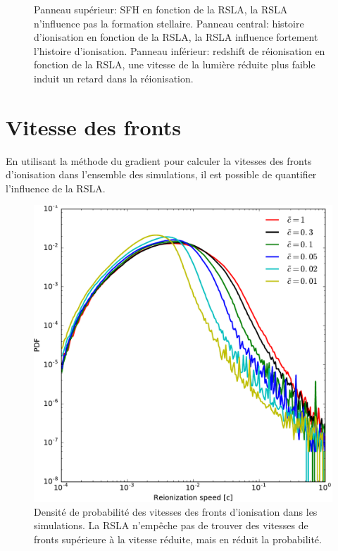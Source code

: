 \begin{figure}
        \caption[Redshift de réionisation en fonction de la RSLA]{
		Panneau supérieur: SFH en fonction de la RSLA, la RSLA n'influence pas la formation stellaire.
		Panneau central: histoire d'ionisation en fonction de la RSLA, la RSLA influence fortement l'histoire d'ionisation.
		Panneau inférieur: redshift de réionisation en fonction de la RSLA, une vitesse de la lumière réduite plus faible induit un retard dans la réionisation.
 		\label{fig:zrsla}}
\end{figure}

\clearpage 

\section{Vitesse des fronts}

En utilisant la méthode du gradient pour calculer la vitesses des fronts d'ionisation dans l'ensemble des simulations, il est possible de quantifier l'influence de la \ac{RSLA}.

\begin{figure}
        \includegraphics[width=.95\linewidth]{img/04_mapreio/PDF_v_reio.pdf} 
        \caption[PDF des vitesses de fronts]{Densité de probabilité des vitesses des fronts d'ionisation dans les simulations.
        La RSLA n’empêche pas de trouver des vitesses de fronts supérieure à la vitesse réduite, mais en réduit la probabilité.
		\label{fig:pdfv}}
\end{figure}

